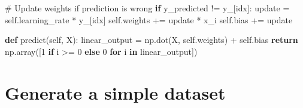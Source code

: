 \documentclass[
  letterpaper,
  DIV=11,
  numbers=noendperiod]{scrreprt}
\newenvironment{Shaded}{\begin{snugshade}}{\end{snugshade}}
\newcommand{\CommentTok}[1]{\textcolor[rgb]{0.37,0.37,0.37}{#1}}
\newcommand{\ControlFlowTok}[1]{\textcolor[rgb]{0.00,0.23,0.31}{\textbf{#1}}}
\newcommand{\DecValTok}[1]{\textcolor[rgb]{0.68,0.00,0.00}{#1}}
\newcommand{\KeywordTok}[1]{\textcolor[rgb]{0.00,0.23,0.31}{\textbf{#1}}}
\newcommand{\NormalTok}[1]{\textcolor[rgb]{0.00,0.23,0.31}{#1}}
\newcommand{\OperatorTok}[1]{\textcolor[rgb]{0.37,0.37,0.37}{#1}}
\newcommand{\VariableTok}[1]{\textcolor[rgb]{0.07,0.07,0.07}{#1}}
\begin{document}
\begin{Shaded}
\begin{Highlighting}[]
                \CommentTok{\# Update weights if prediction is wrong}
                \ControlFlowTok{if}\NormalTok{ y\_predicted }\OperatorTok{!=}\NormalTok{ y\_[idx]:}
\NormalTok{                    update }\OperatorTok{=} \VariableTok{self}\NormalTok{.learning\_rate }\OperatorTok{*}\NormalTok{ y\_[idx]}
                    \VariableTok{self}\NormalTok{.weights }\OperatorTok{+=}\NormalTok{ update }\OperatorTok{*}\NormalTok{ x\_i}
                    \VariableTok{self}\NormalTok{.bias }\OperatorTok{+=}\NormalTok{ update}

    \KeywordTok{def}\NormalTok{ predict(}\VariableTok{self}\NormalTok{, X):}
\NormalTok{        linear\_output }\OperatorTok{=}\NormalTok{ np.dot(X, }\VariableTok{self}\NormalTok{.weights) }\OperatorTok{+} \VariableTok{self}\NormalTok{.bias}
        \ControlFlowTok{return}\NormalTok{ np.array([}\DecValTok{1} \ControlFlowTok{if}\NormalTok{ i }\OperatorTok{\textgreater{}=} \DecValTok{0} \ControlFlowTok{else} \DecValTok{0} \ControlFlowTok{for}\NormalTok{ i }\KeywordTok{in}\NormalTok{ linear\_output])}
\end{Highlighting}
\end{Shaded}


\chapter{Generate a simple dataset}\label{generate-a-simple-dataset}
\end{document}
